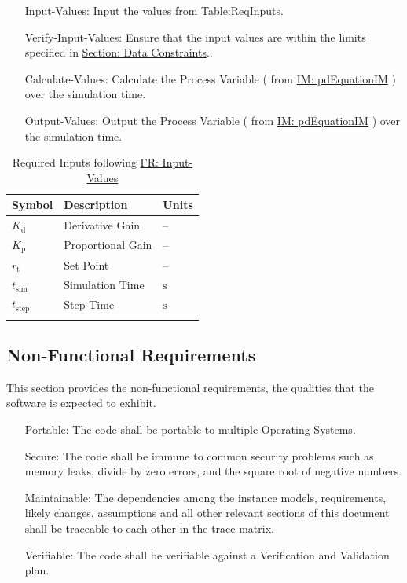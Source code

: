 \documentclass[12pt]{article}
\begin{document}
\begin{itemize}
\item[Input-Values:\phantomsection\label{inputValues}]{Input the values from \hyperref[Table:ReqInputs]{Table:ReqInputs}.}
\item[Verify-Input-Values:\phantomsection\label{verifyInputs}]{Ensure that the input values are within the limits specified in \hyperref[Sec:DataConstraints]{Section: Data Constraints}..}
\item[Calculate-Values:\phantomsection\label{calculateValues}]{Calculate the Process Variable ( from \hyperref[IM:pdEquationIM]{IM: pdEquationIM}  ) over  the simulation time.}
\item[Output-Values:\phantomsection\label{outputValues}]{Output the Process Variable ( from \hyperref[IM:pdEquationIM]{IM: pdEquationIM}  ) over  the simulation time.}
\end{itemize}
\begin{longtable}{l l l}
\toprule
\textbf{Symbol} & \textbf{Description} & \textbf{Units}
\\
\midrule
\endhead
${K_{\text{d}}}$ & Derivative Gain & --
\\
${K_{\text{p}}}$ & Proportional Gain & --
\\
${r_{\text{t}}}$ & Set Point & --
\\
${t_{\text{sim}}}$ & Simulation Time & ${\text{s}}$
\\
${t_{\text{step}}}$ & Step Time & ${\text{s}}$
\\
\bottomrule
\caption{Required Inputs following \hyperref[inputValues]{FR: Input-Values}}
\label{Table:ReqInputs}
\end{longtable}
\subsection{Non-Functional Requirements}
\label{Sec:NFRs}
This section provides the non-functional requirements, the qualities that the software is expected to exhibit.

\begin{itemize}
\item[Portable:\phantomsection\label{portability}]{The code shall be portable to multiple Operating Systems.}
\item[Secure:\phantomsection\label{security}]{The code shall be immune to common security problems such as memory leaks, divide by zero errors, and the square root of negative numbers.}
\item[Maintainable:\phantomsection\label{maintainability}]{The dependencies among the instance models, requirements, likely changes, assumptions and all other relevant sections of this document shall be traceable to each other in the trace matrix.}
\item[Verifiable:\phantomsection\label{verifiability}]{The code shall be verifiable against a Verification and Validation plan.}
\end{itemize}
\end{document}
